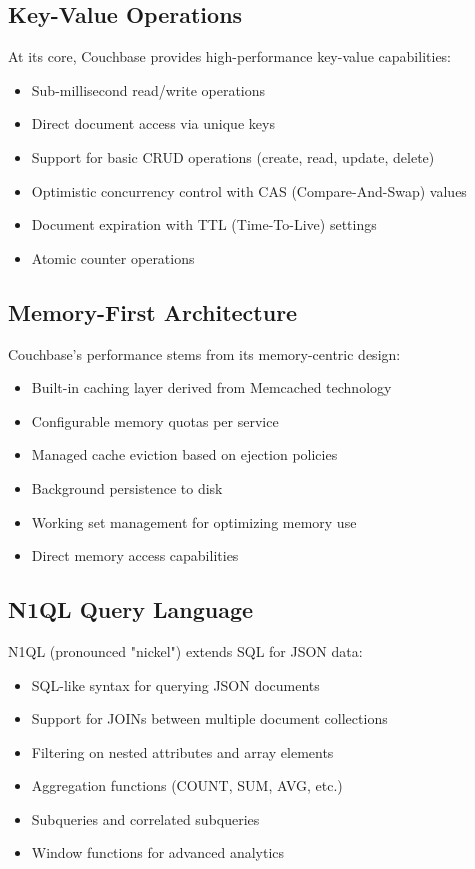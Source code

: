 \subsection{Key-Value Operations}
At its core, Couchbase provides high-performance key-value capabilities:
\begin{itemize}
  \item Sub-millisecond read/write operations
  \item Direct document access via unique keys
  \item Support for basic CRUD operations (create, read, update, delete)
  \item Optimistic concurrency control with CAS (Compare-And-Swap) values
  \item Document expiration with TTL (Time-To-Live) settings
  \item Atomic counter operations
\end{itemize}

\subsection{Memory-First Architecture}
Couchbase's performance stems from its memory-centric design:
\begin{itemize}
  \item Built-in caching layer derived from Memcached technology
  \item Configurable memory quotas per service
  \item Managed cache eviction based on ejection policies
  \item Background persistence to disk
  \item Working set management for optimizing memory use
  \item Direct memory access capabilities
\end{itemize}

\subsection{N1QL Query Language}
N1QL (pronounced "nickel") extends SQL for JSON data:
\begin{itemize}
  \item SQL-like syntax for querying JSON documents
  \item Support for JOINs between multiple document collections
  \item Filtering on nested attributes and array elements
  \item Aggregation functions (COUNT, SUM, AVG, etc.)
  \item Subqueries and correlated subqueries
  \item Window functions for advanced analytics
\end{itemize}

